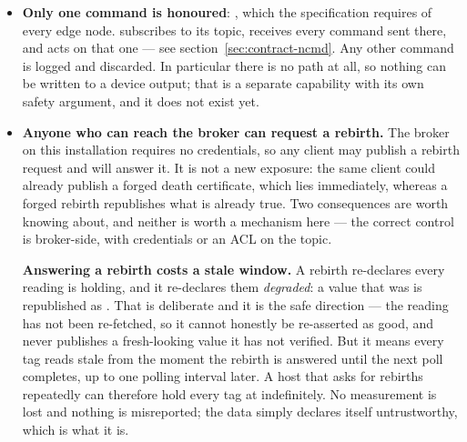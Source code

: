 \begin{itemize}
  \item \textbf{Only one command is honoured}: , which the
        specification requires of every edge node. \prog subscribes to its 
        topic, receives every command sent there, and acts on that one --- see
        section~\ref{sec:contract-ncmd}. Any other command is logged and discarded. In
        particular there is no  path at all, so nothing can be written to a
        device output; that is a separate capability with its own safety argument, and it
        does not exist yet.
  \item \textbf{Anyone who can reach the broker can request a rebirth.} The broker on this
        installation requires no credentials, so any client may publish a rebirth request
        and \prog will answer it. It is not a new exposure: the same client could already
        publish a forged death certificate, which lies immediately, whereas a forged rebirth
        republishes what is already true. Two consequences are worth knowing about, and
        neither is worth a mechanism here --- the correct control is broker-side, with
        credentials or an ACL on the  topic.

        \textbf{Answering a rebirth costs a stale window.} A rebirth re-declares every
        reading \prog is holding, and it re-declares them \emph{degraded}: a value that was
         is republished as . That is deliberate and it is the
        safe direction --- the reading has not been re-fetched, so it cannot honestly be
        re-asserted as good, and \prog never publishes a fresh-looking value it has not
        verified. But it means every tag reads stale from the moment the rebirth is answered
        until the next poll completes, up to one polling interval later. A host that asks for
        rebirths repeatedly can therefore hold every tag at  indefinitely.
        No measurement is lost and nothing is misreported; the data simply declares itself
        untrustworthy, which is what it is.


\end{itemize}
